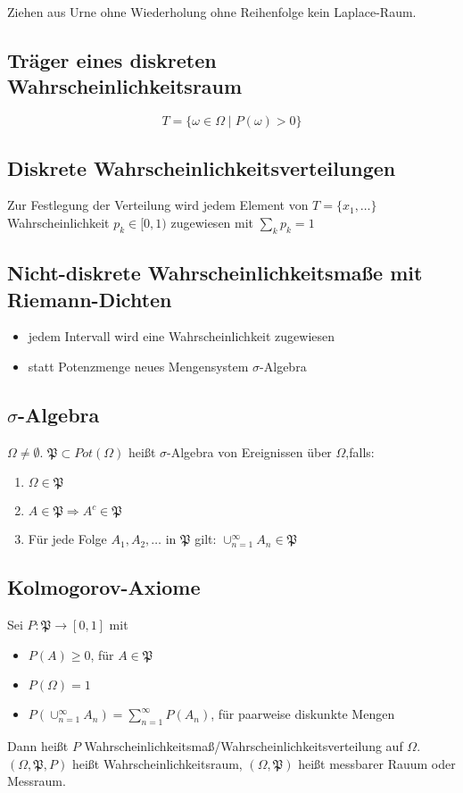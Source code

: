 \documentclass{scrartcl}%
\begin{document}
Ziehen aus Urne ohne Wiederholung ohne Reihenfolge kein Laplace-Raum.

\subsection{Träger eines diskreten Wahrscheinlichkeitsraum}
\[T = \{\omega \in \Omega \mid P(\omega) > 0\}\]

\subsection{Diskrete Wahrscheinlichkeitsverteilungen}
Zur Festlegung der Verteilung wird jedem Element von $T = \{x_1, \ldots\}$ Wahrscheinlichkeit $p_k \in [0,1)$ zugewiesen mit $\sum_k p_k = 1$

\subsection{Nicht-diskrete Wahrscheinlichkeitsmaße mit Riemann-Dichten}
\begin{itemize}
	\item{jedem Intervall wird eine Wahrscheinlichkeit zugewiesen}
	\item{statt Potenzmenge neues Mengensystem $\sigma$-Algebra}
\end{itemize}

\subsection{$\sigma$-Algebra}
$\Omega \neq \emptyset$. $\mathfrak{P} \subset Pot(\Omega)$ heißt $\sigma$-Algebra von Ereignissen über $\Omega$,falls:
\begin{enumerate}
	\item{$\Omega \in \mathfrak{P}$}
	\item{$A \in \mathfrak{P} \Rightarrow A^c \in \mathfrak{P}$}
	\item{Für jede Folge $A_1, A_2,\ldots$ in $\mathfrak{P}$ gilt: $\cup_{n=1}^{\infty} A_n \in \mathfrak{P}$}
\end{enumerate}

\subsection{Kolmogorov-Axiome}
Sei $P:\mathfrak{P} \rightarrow [0,1]$ mit
\begin{itemize}
	\item{$P(A) \geq 0$, für $A \in \mathfrak{P}$}
	\item{$P(\Omega) = 1$}
	\item{$P(\cup_{n=1}^{\infty} A_n) = \sum_{n=1}^{\infty} P (A_n)$, für paarweise diskunkte Mengen} 
\end{itemize}
Dann heißt $P$ Wahrscheinlichkeitsmaß/Wahrscheinlichkeitsverteilung auf $\Omega$. $(\Omega,\mathfrak{P},P)$ heißt Wahrscheinlichkeitsraum, $(\Omega,\mathfrak{P})$ heißt messbarer Rauum oder Messraum.
\end{document}
